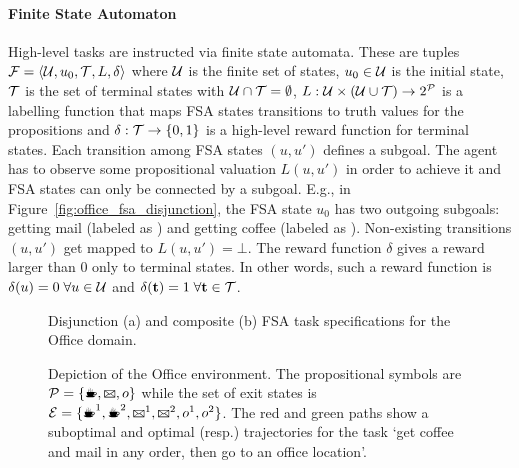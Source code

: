 \paragraph{Finite State Automaton} High-level tasks are instructed via finite state automata. These are tuples ${\mathcal{F}=\langle \mathcal{U},u_0,\mathcal{T},L,\delta\rangle}$ where $\mathcal{U}$ is the finite set of states, $u_0\in\mathcal{U}$ is the initial state, $\mathcal{T}$ is the set of terminal states with $\mathcal{U}\cap\mathcal{T}=\emptyset$, $L:\mathcal{U}\times(\mathcal{U}\cup\mathcal{T})\rightarrow 2^{\mathcal{P}}$ is a labelling function that maps FSA states transitions to truth values for the propositions and $\delta:\mathcal{T}\rightarrow \{0, 1\}$ is a high-level reward function for terminal states. Each transition among FSA states $(u, u')$ defines a subgoal. The agent has to observe some propositional valuation $L(u, u')$ in order to achieve it and FSA states can only be connected by a subgoal. E.g., in Figure~\ref{fig:office_fsa_disjunction}, the FSA state $u_0$ has two outgoing subgoals: getting mail (labeled as \mail) and getting coffee (labeled as \coffee). Non-existing transitions $(u, u')$ get mapped to $L(u, u')=\bot$. The reward function $\delta$ gives a reward larger than 0 only to terminal states. In other words, such a reward function is $\delta(u)=0\;\forall u\in\mathcal{U}$ and $\delta(\mathbf{t})=1\;\forall \mathbf{t}\in\mathcal{T}$. 

\begin{figure}[!hbt]
  \centering
  \begin{subfigure}[h]{0.5\textwidth}
    \centering
    
  \end{subfigure}
  \begin{subfigure}[h]{0.5\textwidth}
    \centering
    
  \end{subfigure}
  \begin{subfigure}[t]{0.5\textwidth}
    \centering
    
    \label{fig:officetaskcomposite}
  \end{subfigure}
  \caption{Disjunction (a) and composite (b) FSA task specifications for the Office domain.}
 \label{fig:sample_fsas}
\end{figure} 



\begin{figure}[!tb]
  \centering
  
  \label{fig:office_domain}
  \caption{Depiction of the Office environment. The propositional symbols are $\cP=\{\text{\coffee}, \text{\mail}, o\}$ while the set of exit states is $\cE=\{\text{\coffee}^1,\text{\coffee}^2, \text{\mail}^1,\text{\mail}^2, o^1, o^2\}$. The red and green paths show a suboptimal and optimal (resp.) trajectories for the task `get coffee and mail in any order, then go to an office location'.}
 \label{fig:domains}
\end{figure}


